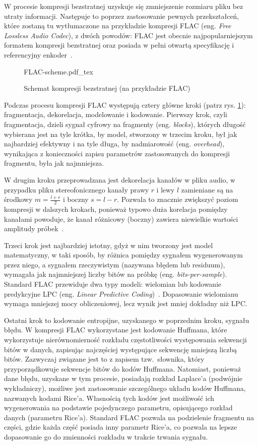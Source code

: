 \documentclass[pl,12pt]{aghdpl}
\begin{document}
W procesie kompresji bezstratnej uzyskuje się zmniejszenie rozmiaru pliku bez
utraty informacji. Następuje to poprzez zastosowanie pewnych przekształceń,
które zostaną tu wytłumaczone na przykładzie kompresji FLAC
(eng. \textit{Free Lossless Audio Codec}), z dwóch powodów: FLAC jest obecnie
najpopularniejszym formatem kompresji bezstratnej oraz posiada w pełni otwartą
specyfikację i referencyjny enkoder~\cite{XiphFLAC}.

\begin{figure}[!tbh]
  \centering
  {FLAC-scheme.pdf_tex}
  \caption{Schemat kompresji bezstratnej (na przykładzie FLAC)}
  \label{fig:FLAC_scheme}
\end{figure}

Podczas procesu kompresji FLAC występują cztery główne kroki (patrz rys.
\ref{fig:FLAC_scheme}): fragmentacja, dekorelacja, modelowanie i kodowanie.
Pierwszy krok, czyli fragmentacja, dzieli sygnał cyfrowy na fragmenty (eng.
\textit{blocks}), których długość wybierana jest na tyle krótka, by model,
stworzony w trzecim kroku, był jak najbardziej efektywny i na tyle długa, by
nadmiarowość (eng. \textit{overhead}), wynikająca z konieczności zapisu
parametrów zastosowanych do kompresji fragmentu, była jak najmniejsza. 

W drugim kroku przeprowadzana jest dekorelacja kanałów w pliku audio, w
przypadku pliku stereofonicznego kanały prawy $r$ i lewy $l$ zamieniane są na środkowy
$m = \frac{l + r}{2}$ i boczny $s = l - r$. Pozwala to znacznie zwiększyć
poziom kompresji w dalszych krokach, ponieważ typowo duża korelacja pomiędzy
kanałami powoduje, że kanał różnicowy (boczny) zawiera niewielkie wartości
amplitudy próbek~\cite{MuinGunawanKartiwiElsheikh2017}.

Trzeci krok jest najbardziej istotny, gdyż w nim tworzony jest model
matematyczny, w taki sposób, by różnica pomiędzy sygnałem wygenerowanym przez
niego, a sygnałem rzeczywistym (nazywana błędem lub residuum), wymagała
jak najmniejszej liczby bitów na próbkę (eng. \textit{bits-per-sample}).
Standard FLAC przewiduje dwa typy modeli: wielomian lub kodowanie predykcyjne
LPC (eng. \textit{Linear Predictive Coding})~\cite{Shaughnessy1988}.
Dopasowanie wielomianu wymaga mniejszej mocy obliczeniowej, lecz wynik jest
mniej dokładny niż LPC.

Ostatni krok to kodowanie entropijne, uzyskanego w poprzednim kroku, sygnału
błędu. W kompresji FLAC wykorzystane jest kodowanie Huffmana, które
wykorzystuje nierównomierność rozkładu częstotliwości występowania sekwencji
bitów w danych, zapisując najczęściej występujące sekwencję mniejszą liczbą
bitów. Zazwyczaj związane jest to z zapisem tzw.\ słownika, który
przyporządkowuje sekwencje bitów do kodów Huffmana. Natomiast, ponieważ dane
błędu, uzyskane w tym procesie, posiadają rozkład Laplace'a (podwójnie
wykładniczy), możliwe jest zastosowanie szczególnego układu kodów Huffmana,
nazwanych kodami Rice'a. Własnością tych kodów jest możliwość ich wygenerowania
na podstawie pojedynczego parametru, opisującego rozkład danych (parametru
Rice'a). Standard FLAC pozwala na podzielenie fragmentu na części,
gdzie każda część posiada inny parametr Rice'a, co pozwala na lepsze
dopasowanie go do zmienności rozkładu w trakcie trwania sygnału.
\end{document}
